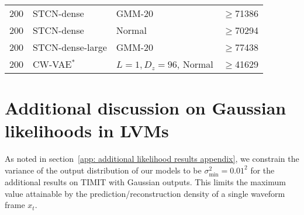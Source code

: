 {\begin{table}[t!]
\begin{tabular}{lll|r}
        200 & STCN-dense {\scriptsize \cite{aksan_stcn_2019}}                     & GMM-20 & $\geq$71386\\
        200 & STCN-dense {\scriptsize \cite{aksan_stcn_2019}}                     & Normal & $\geq$70294\\
        200 & STCN-dense-large {\scriptsize \cite{aksan_stcn_2019}}               & GMM-20 & $\geq$77438\\
        200 & CW-VAE$^*$                                         & $L=1, D_z=96$, Normal & $\geq$41629 \\  %
        \bottomrule
    \end{tabular}
    \label{tab: timit likelihoods gaussian appendix}
\end{table}


\section{Additional discussion on Gaussian likelihoods in LVMs} \label{app: gaussian likelihood unboundedness discussion}
As noted in section~\cref{app: additional likelihood results appendix}, we constrain the variance of the output distribution of our models to be $\sigma^2_\text{min} = 0.01^2$ for the additional results on TIMIT with Gaussian outputs. This limits the maximum value attainable by the prediction/reconstruction density of a single waveform frame $x_t$. 

}
